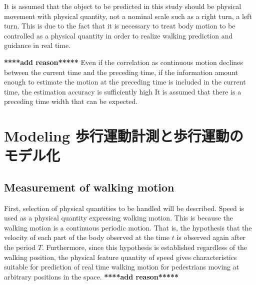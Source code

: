 \documentclass{sigchi}
\begin{document}
It is assumed that the object to be predicted in this study should be physical movement with physical quantity, not a nominal scale such as a right turn, a left turn. This is due to the fact that it is necessary to treat body motion to be controlled as a physical quantity in order to realize walking prediction and guidance in real time. 

{\bf  *****add reason*****} Even if the correlation as continuous motion declines between the current time and the preceding time, if the information amount enough to estimate the motion at the preceding time is included in the current time, the estimation accuracy is sufficiently high It is assumed that there is a preceding time width that can be expected.


\section{Modeling 歩行運動計測と歩行運動のモデル化}%

\subsection{Measurement of walking motion} %
\label{subsec-nac}

First, selection of physical quantities to be handled will be described. Speed is used as a physical quantity expressing walking motion. This is because the walking motion is a continuous periodic motion. That is, the hypothesis that the velocity of each part of the body observed at the time $ t $ is observed again after the period $ T $. Furthermore, since this hypothesis is established regardless of the walking position, the physical feature quantity of speed gives characteristics suitable for prediction of real time walking motion for pedestrians moving at arbitrary positions in the space. {\bf  *****add reason*****}
\end{document}
